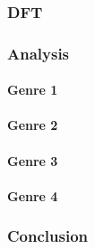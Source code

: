 \subsubsection{DFT}

\subsubsection{Analysis}

\paragraph{Genre 1}

\paragraph{Genre 2}

\paragraph{Genre 3}

\paragraph{Genre 4}

\subsubsection{Conclusion}


